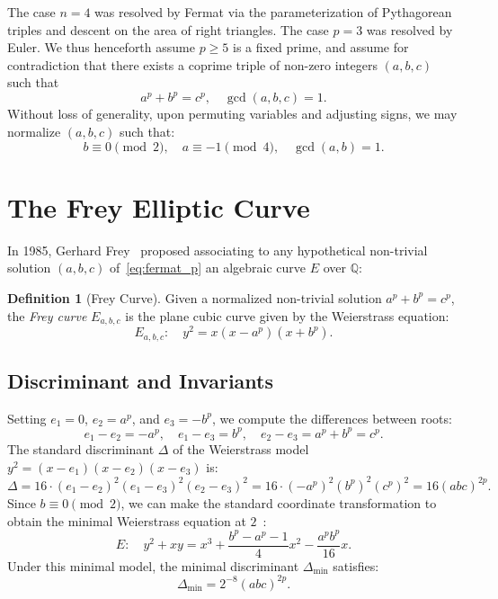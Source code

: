 \documentclass[11pt,a4paper]{article}
\theoremstyle{plain}
\theoremstyle{definition}
\newtheorem{definition}[theorem]{Definition}
\theoremstyle{remark}
\newcommand{\Q}{\mathbb{Q}}
\begin{document}
The case $n = 4$ was resolved by Fermat via the parameterization of Pythagorean triples and descent on the area of right triangles. The case $p = 3$ was resolved by Euler. We thus henceforth assume $p \ge 5$ is a fixed prime, and assume for contradiction that there exists a coprime triple of non-zero integers $(a, b, c)$ such that
\begin{equation}
\label{eq:fermat_p}
a^p + b^p = c^p, \quad \gcd(a, b, c) = 1.
\end{equation}
Without loss of generality, upon permuting variables and adjusting signs, we may normalize $(a, b, c)$ such that:
\begin{equation}
\label{eq:parity_norm}
b \equiv 0 \pmod 2, \quad a \equiv -1 \pmod 4, \quad \gcd(a, b) = 1.
\end{equation}

\section{The Frey Elliptic Curve}

In 1985, Gerhard Frey~\cite{frey1986} proposed associating to any hypothetical non-trivial solution $(a, b, c)$ of~\eqref{eq:fermat_p} an algebraic curve $E$ over $\Q$:

\begin{definition}[Frey Curve]
Given a normalized non-trivial solution $a^p + b^p = c^p$, the \emph{Frey curve} $E_{a,b,c}$ is the plane cubic curve given by the Weierstrass equation:
\begin{equation}
\label{eq:frey}
E_{a,b,c}: \quad y^2 = x(x - a^p)(x + b^p).
\end{equation}
\end{definition}

\subsection{Discriminant and Invariants}
Setting $e_1 = 0$, $e_2 = a^p$, and $e_3 = -b^p$, we compute the differences between roots:
\[
e_1 - e_2 = -a^p, \quad e_1 - e_3 = b^p, \quad e_2 - e_3 = a^p + b^p = c^p.
\]
The standard discriminant $\Delta$ of the Weierstrass model $y^2 = (x - e_1)(x - e_2)(x - e_3)$ is:
\begin{equation}
\Delta = 16 \cdot (e_1 - e_2)^2 (e_1 - e_3)^2 (e_2 - e_3)^2 = 16 \cdot (-a^p)^2 (b^p)^2 (c^p)^2 = 16 (abc)^{2p}.
\end{equation}
Since $b \equiv 0 \pmod 2$, we can make the standard coordinate transformation to obtain the minimal Weierstrass equation at $2$~\cite{silverman2009}:
\begin{equation}
E: \quad y^2 + xy = x^3 + \frac{b^p - a^p - 1}{4}x^2 - \frac{a^p b^p}{16}x.
\end{equation}
Under this minimal model, the minimal discriminant $\Delta_{\min}$ satisfies:
\begin{equation}
\Delta_{\min} = 2^{-8} (abc)^{2p}.
\end{equation}
\end{document}
